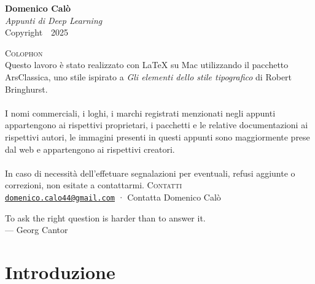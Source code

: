 
\vspace*{\fill}

\begin{center}
    \textbf{Domenico Calò} \\
    \textit{Appunti di Deep Learning} \\
    Copyright~\textcopyright~2025
\end{center}

\vspace*{\fill}

\renewcommand{\baselinestretch}{1.2}\normalsize

\textsc{Colophon} \\
Questo lavoro è stato realizzato con \LaTeX{} su Mac utilizzando il pacchetto \textsf{ArsClassica}, uno stile ispirato a \textit{Gli elementi dello stile tipografico} di Robert Bringhurst. \\\\I nomi commerciali, i loghi, i marchi registrati menzionati negli appunti appartengono ai rispettivi proprietari, i pacchetti e le relative documentazioni ai rispettivi autori, le immagini presenti in questi appunti sono maggiormente prese dal web e appartengono ai rispettivi creatori.\\\\In caso di necessità dell'effetuare segnalazioni per eventuali, refusi aggiunte o correzioni, non esitate a contattarmi.
\vspace{1.5em}
\textsc{Contatti} \\
\faEnvelope[regular] \href{mailto:domenico.calo44@gmail.com}{\texttt{domenico.calo44@gmail.com}} · Contatta Domenico Calò
\newpage
\vspace*{\fill}

\begin{center}
    To ask the right question is harder than to answer it.\\
    — Georg Cantor
\end{center}

\vspace*{\fill}
\chapter*{Introduzione}

